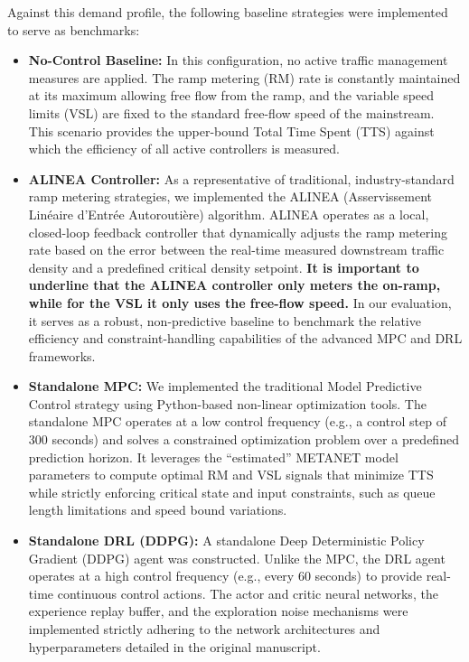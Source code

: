 Against this demand profile, the following baseline strategies were implemented to serve as benchmarks:

\begin{itemize}
    \item \textbf{No-Control Baseline:} In this configuration, no active traffic management measures are applied. The ramp metering (RM) rate is constantly maintained at its maximum allowing free flow from the ramp, and the variable speed limits (VSL) are fixed to the standard free-flow speed of the mainstream. This scenario provides the upper-bound Total Time Spent (TTS) against which the efficiency of all active controllers is measured.
    
    \item \textbf{ALINEA Controller:} As a representative of traditional, industry-standard ramp metering strategies, we implemented the ALINEA (Asservissement Linéaire d'Entrée Autoroutière) algorithm. ALINEA operates as a local, closed-loop feedback controller that dynamically adjusts the ramp metering rate based on the error between the real-time measured downstream traffic density and a predefined critical density setpoint. \textbf{It is important to underline that the ALINEA controller only meters the on-ramp, while for the VSL it only uses the free-flow speed.} In our evaluation, it serves as a robust, non-predictive baseline to benchmark the relative efficiency and constraint-handling capabilities of the advanced MPC and DRL frameworks.

    \item \textbf{Standalone MPC:} We implemented the traditional Model Predictive Control strategy using Python-based non-linear optimization tools. The standalone MPC operates at a low control frequency (e.g., a control step of 300 seconds) and solves a constrained optimization problem over a predefined prediction horizon. It leverages the ``estimated'' METANET model parameters to compute optimal RM and VSL signals that minimize TTS while strictly enforcing critical state and input constraints, such as queue length limitations and speed bound variations.
    
    \item \textbf{Standalone DRL (DDPG):} A standalone Deep Deterministic Policy Gradient (DDPG) agent was constructed. Unlike the MPC, the DRL agent operates at a high control frequency (e.g., every 60 seconds) to provide real-time continuous control actions. The actor and critic neural networks, the experience replay buffer, and the exploration noise mechanisms were implemented strictly adhering to the network architectures and hyperparameters detailed in the original manuscript.
\end{itemize}

